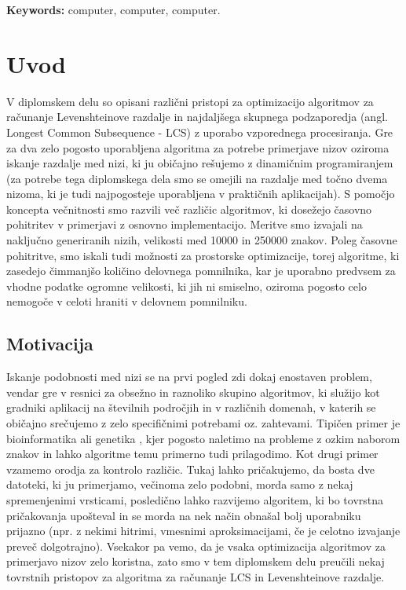 \documentclass[a4paper,12pt,openright]{book}
\newcommand{\tkeywordsEn}{computer, computer, computer}
\newcommand{\clearemptydoublepage}{\newpage{\pagestyle{empty}\cleardoublepage}}
\begin{document}
\bigskip

\noindent\textbf{Keywords:} \tkeywordsEn.
\clearemptydoublepage

\mainmatter
\setcounter{page}{1}
\pagestyle{fancy}

\chapter{Uvod}

V diplomskem delu so opisani različni pristopi za optimizacijo algoritmov za računanje Levenshteinove razdalje in najdaljšega skupnega podzaporedja (angl. Longest Common Subsequence - LCS) z uporabo vzporednega procesiranja. Gre za dva zelo pogosto uporabljena algoritma za potrebe primerjave nizov oziroma iskanje razdalje med nizi, ki ju običajno rešujemo z dinamičnim programiranjem (za potrebe tega diplomskega dela smo se omejili na razdalje med točno dvema nizoma, ki je tudi najpogosteje uporabljena v praktičnih aplikacijah). S pomočjo koncepta večnitnosti smo razvili več različic algoritmov, ki dosežejo časovno pohitritev v primerjavi z osnovno implementacijo. Meritve smo izvajali na naključno generiranih nizih, velikosti med 10000 in 250000 znakov. Poleg časovne pohitritve, smo iskali tudi možnosti za prostorske optimizacije, torej algoritme, ki zasedejo čimmanjšo količino delovnega pomnilnika, kar je uporabno predvsem za vhodne podatke ogromne velikosti, ki jih ni smiselno, oziroma pogosto celo nemogoče v celoti hraniti v delovnem pomnilniku. 

\section{Motivacija}

Iskanje podobnosti med nizi se na prvi pogled zdi dokaj enostaven problem, vendar gre v resnici za obsežno in raznoliko skupino algoritmov, ki služijo kot gradniki aplikacij na številnih področjih in v različnih domenah, v katerih se običajno srečujemo z zelo specifičnimi potrebami oz. zahtevami. Tipičen primer je bioinformatika ali genetika \cite{LCSpracticalUse}, kjer pogosto naletimo na probleme z ozkim naborom znakov in lahko algoritme temu primerno tudi prilagodimo. Kot drugi primer vzamemo orodja za kontrolo različic. Tukaj lahko pričakujemo, da bosta dve datoteki, ki ju primerjamo, večinoma zelo podobni, morda samo z nekaj spremenjenimi vrsticami, posledično lahko razvijemo algoritem, ki bo tovrstna pričakovanja upošteval in se morda na nek način obnašal bolj uporabniku prijazno (npr. z nekimi hitrimi, vmesnimi aproksimacijami, če je celotno izvajanje preveč dolgotrajno). Vsekakor pa vemo, da je vsaka optimizacija algoritmov za primerjavo nizov zelo koristna, zato smo v tem diplomskem delu preučili nekaj tovrstnih pristopov za algoritma za računanje LCS in Levenshteinove razdalje. 
\end{document}
